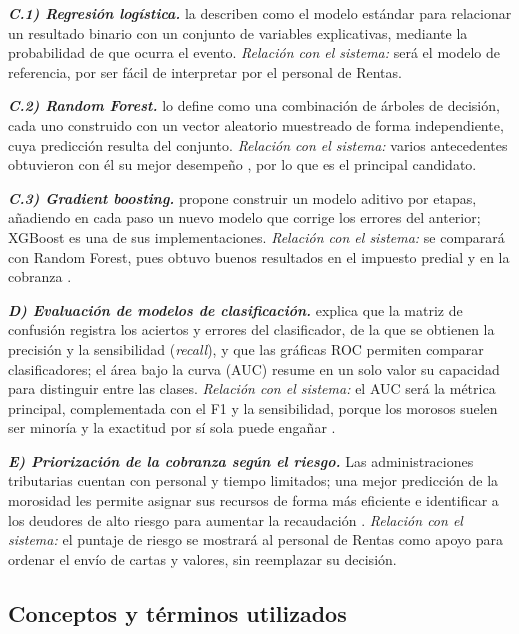 \documentclass[12pt,a4paper]{report}
\begin{document}
\noindent\textbf{\textit{C.1) Regresión logística.}} \textcite{hosmer2013} la describen como el modelo estándar para relacionar un resultado binario con un conjunto de variables explicativas, mediante la probabilidad de que ocurra el evento. \textit{Relación con el sistema:} será el modelo de referencia, por ser fácil de interpretar por el personal de Rentas.

\noindent\textbf{\textit{C.2) Random Forest.}} \textcite{breiman2001} lo define como una combinación de árboles de decisión, cada uno construido con un vector aleatorio muestreado de forma independiente, cuya predicción resulta del conjunto. \textit{Relación con el sistema:} varios antecedentes obtuvieron con él su mejor desempeño \parencite{orozco2023,sifani2025,lismoncaleano2026,yang2025}, por lo que es el principal candidato.

\noindent\textbf{\textit{C.3) Gradient boosting.}} \textcite{friedman2001} propone construir un modelo aditivo por etapas, añadiendo en cada paso un nuevo modelo que corrige los errores del anterior; XGBoost es una de sus implementaciones. \textit{Relación con el sistema:} se comparará con Random Forest, pues obtuvo buenos resultados en el impuesto predial \parencite{sugiana2026} y en la cobranza \parencite{carrera2024}.

\noindent\textbf{\textit{D) Evaluación de modelos de clasificación.}} \textcite{fawcett2006} explica que la matriz de confusión registra los aciertos y errores del clasificador, de la que se obtienen la precisión y la sensibilidad (\textit{recall}), y que las gráficas ROC permiten comparar clasificadores; el área bajo la curva (AUC) resume en un solo valor su capacidad para distinguir entre las clases. \textit{Relación con el sistema:} el AUC será la métrica principal, complementada con el F1 y la sensibilidad, porque los morosos suelen ser minoría y la exactitud por sí sola puede engañar \parencite{encalada2025}.

\noindent\textbf{\textit{E) Priorización de la cobranza según el riesgo.}} Las administraciones tributarias cuentan con personal y tiempo limitados; una mejor predicción de la morosidad les permite asignar sus recursos de forma más eficiente \parencite{leekim2024} e identificar a los deudores de alto riesgo para aumentar la recaudación \parencite{ourdani2024}. \textit{Relación con el sistema:} el puntaje de riesgo se mostrará al personal de Rentas como apoyo para ordenar el envío de cartas y valores, sin reemplazar su decisión.

\subsection{Conceptos y términos utilizados}
\end{document}
